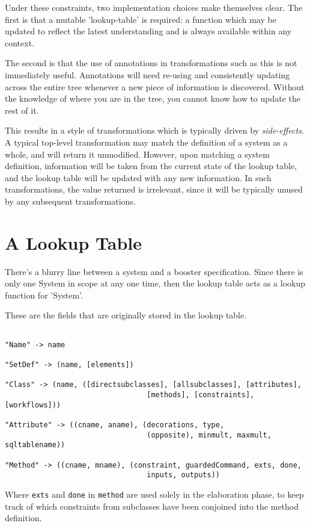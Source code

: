 Under these constraints, two implementation choices make themselves
clear.  The first is that a mutable 'lookup-table' is required: a
function which may be updated to reflect the latest understanding and
is always available within any context.

The second is that the use of annotations in transformations such as
this is not immediately useful.  Annotations will need re-using and
consistently updating across the entire tree whenever a new piece of
information is discovered.  Without the knowledge of where you are in
the tree, you cannot know how to update the rest of it.  

This results in a style of transformations which is typically driven
by \emph{side-effects}.  A typical top-level transformation may match
the definition of a system as a whole, and will return it unmodified.
However, upon matching a system definition, information will be taken
from the current state of the lookup table, and the lookup table will
be updated with any new information.  In such transformations, the
value returned is irrelevant, since it will be typically unused by any
subsequent transformations.




\section{A Lookup Table}

There's a blurry line between a system and a booster specification.
Since there is only one System in scope at any one time, then the
lookup table acts as a lookup function for 'System'.

These are the fields that are originally stored in the lookup table.

\begin{verbatim}

"Name" -> name

"SetDef" -> (name, [elements])

"Class" -> (name, ([directsubclasses], [allsubclasses], [attributes],  
                                 [methods], [constraints], [workflows]))

"Attribute" -> ((cname, aname), (decorations, type, 
                                 (opposite), minmult, maxmult, sqltablename)) 

"Method" -> ((cname, mname), (constraint, guardedCommand, exts, done, 
                                 inputs, outputs))

\end{verbatim}

Where \verb|exts| and \verb|done| in \verb|method| are used solely in the elaboration
phase, to keep track of which constraints from subclasses have been
conjoined into the method definition.
